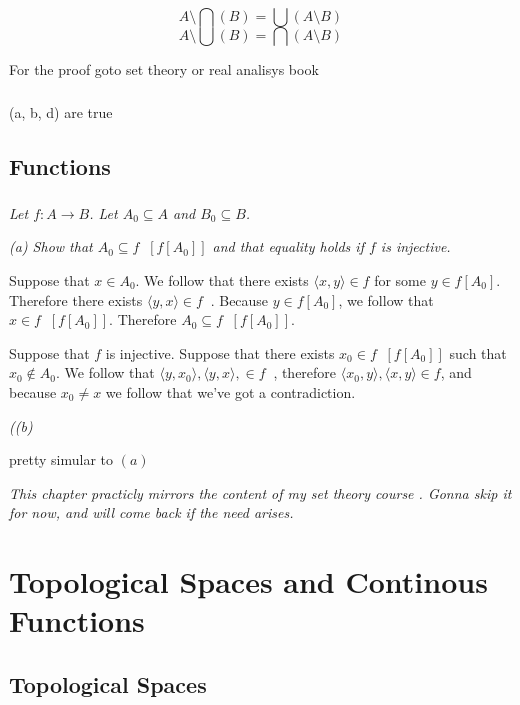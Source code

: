 \documentclass[11pt,oneside,titlepage]{book}
\DeclareMathOperator \inv {^{-1}}
\newcommand{\eangle}[1]{\langle #1 \rangle}
\begin{document}
$$A \setminus \bigcap{(B)} = \bigcup{(A \setminus B)} $$
$$A \setminus \bigcup{(B)} = \bigcap{(A \setminus B)} $$

For the proof goto set theory or real analisys book

\subsection{}

(a, b, d) are true

\section{Functions}

\subsection{}

\textit{Let $f: A \to B$. Let $A_0 \subseteq A$ and $B_0 \subseteq B$.}

\textit{(a) Show that $A_0 \subseteq f\inv[f[A_0]]$ and that equality holds
  if $f$ is injective.}

Suppose that $x \in A_0$. We follow that there exists $\eangle{x, y} \in f$ for some
$y \in f[A_0]$. Therefore there exists $\eangle{y, x} \in f\inv$. Because $y \in f[A_0]$,
we follow that $x \in f\inv[f[A_0]]$. Therefore $A_0 \subseteq f\inv[f[A_0]]$.

Suppose that $f$ is injective. Suppose that there exists $x_0 \in f\inv[f[A_0]]$ such that
$x_0 \notin A_0$. We follow that $\eangle{y, x_0}, \eangle{y, x}, \in f\inv$,
therefore $\eangle{x_0, y}, \eangle{x, y} \in f$, and because $x_0 \neq x$ we follow
that we've got a contradiction.

\textit{((b) }

pretty simular to $(a)$

\textit{This chapter practicly mirrors the content of my set theory course
  . Gonna skip it for now, and will come back if the need arises.}

\chapter{Topological Spaces and Continous Functions}

\section{Topological Spaces}
\end{document}
